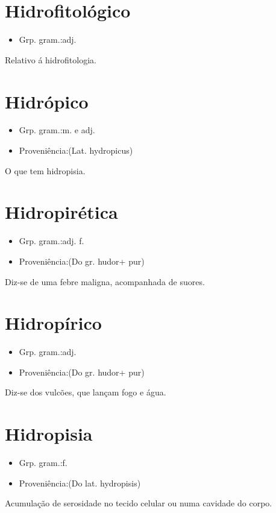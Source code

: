 \documentclass{article}
\begin{document}
\section{Hidrofitológico}
\begin{itemize}
\item {Grp. gram.:adj.}
\end{itemize}
Relativo á hidrofitologia.
\section{Hidrópico}
\begin{itemize}
\item {Grp. gram.:m.  e  adj.}
\end{itemize}
\begin{itemize}
\item {Proveniência:(Lat. \textunderscore hydropicus\textunderscore )}
\end{itemize}
O que tem hidropisia.
\section{Hidropirética}
\begin{itemize}
\item {Grp. gram.:adj. f.}
\end{itemize}
\begin{itemize}
\item {Proveniência:(Do gr. \textunderscore hudor\textunderscore  + \textunderscore pur\textunderscore )}
\end{itemize}
Diz-se de uma febre maligna, acompanhada de suores.
\section{Hidropírico}
\begin{itemize}
\item {Grp. gram.:adj.}
\end{itemize}
\begin{itemize}
\item {Proveniência:(Do gr. \textunderscore hudor\textunderscore  + \textunderscore pur\textunderscore )}
\end{itemize}
Diz-se dos vulcões, que lançam fogo e água.
\section{Hidropisia}
\begin{itemize}
\item {Grp. gram.:f.}
\end{itemize}
\begin{itemize}
\item {Proveniência:(Do lat. \textunderscore hydropisis\textunderscore )}
\end{itemize}
Acumulação de serosidade no tecido celular ou numa cavidade do corpo.
\end{document}
